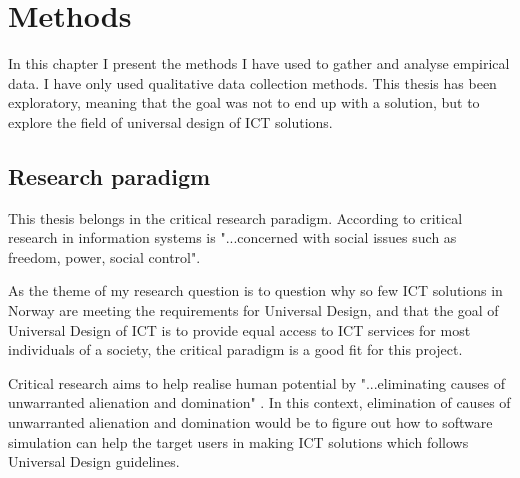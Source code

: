 \chapter{Methods}
In this chapter I present the methods I have used to gather and analyse empirical data. I have only used qualitative data collection methods. This thesis has been exploratory, meaning that the goal was not to end up with a solution, but to explore the field of universal design of ICT solutions.

\section{Research paradigm}
This thesis belongs in the critical research paradigm. According to \textcite{myers_set_2011} critical research in information systems is "...concerned with social issues such as freedom, power, social control". 

As the theme of my research question is to question why so few ICT solutions in Norway are meeting the requirements for Universal Design, and that the goal of Universal Design of ICT is to provide equal access to ICT services for most individuals of a society, the critical paradigm is a good fit for this project. 

Critical research aims to help realise human potential by "...eliminating causes of unwarranted alienation and domination" \textcite{myers_set_2011}. In this context, elimination of causes of unwarranted alienation and domination would be to figure out how to software simulation can help the target users in making ICT solutions which follows Universal Design guidelines. 

